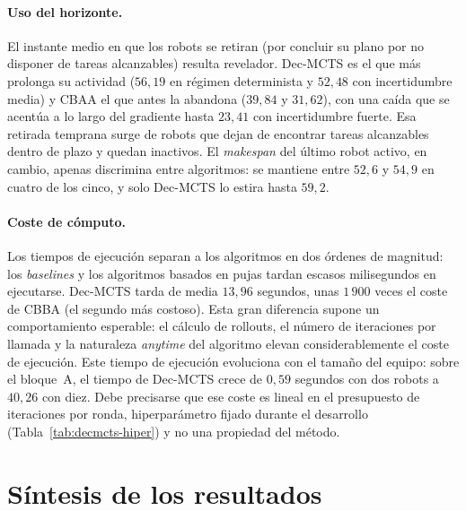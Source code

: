 \paragraph{Uso del horizonte.} El instante medio en que los robots se retiran (por concluir su plano por no disponer de tareas alcanzables) resulta revelador. Dec-MCTS es el que más prolonga su actividad ($56{,}19$ en régimen determinista y $52{,}48$ con incertidumbre media) y CBAA el que antes la abandona ($39{,}84$ y $31{,}62$), con una caída que se acentúa a lo largo del gradiente hasta $23{,}41$ con incertidumbre fuerte. Esa retirada temprana surge de robots que dejan de encontrar tareas alcanzables dentro de plazo y quedan inactivos. El \textit{makespan} del último robot activo, en cambio, apenas discrimina entre algoritmos: se mantiene entre $52{,}6$ y $54{,}9$ en cuatro de los cinco, y solo Dec-MCTS lo estira hasta $59{,}2$.

\paragraph{Coste de cómputo.} Los tiempos de ejecución separan a los algoritmos en dos órdenes de magnitud: los \textit{baselines} y los algoritmos basados en pujas tardan escasos milisegundos en ejecutarse. Dec-MCTS tarda de media $13{,}96$ segundos, unas $1\,900$ veces el coste de CBBA (el segundo más costoso). Esta gran diferencia supone un comportamiento esperable: el cálculo de rollouts, el número de iteraciones por llamada y la naturaleza \textit{anytime} del algoritmo elevan considerablemente el coste de ejecución. Este tiempo de ejecución evoluciona con el tamaño del equipo: sobre el bloque~A, el tiempo de Dec-MCTS crece de $0{,}59$ segundos con dos robots a $40{,}26$ con diez. Debe precisarse que ese coste es lineal en el presupuesto de iteraciones por ronda, hiperparámetro fijado durante el desarrollo (Tabla~\ref{tab:decmcts-hiper}) y no una propiedad del método.

\section{Síntesis de los resultados} \label{sec:exp-sintesis}

